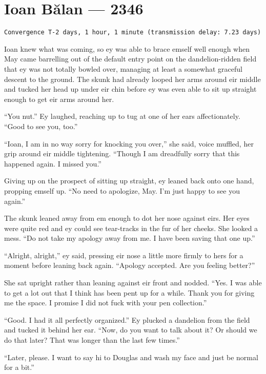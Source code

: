 \hypertarget{ioan-bux103lan-2346}{%
\chapter{Ioan Bălan — 2346}\label{ioan-bux103lan-2346}}

\begin{verbatim}
Convergence T-2 days, 1 hour, 1 minute (transmission delay: 7.23 days)
\end{verbatim}

Ioan knew what was coming, so ey was able to brace emself well enough when May came barrelling out of the default entry point on the dandelion-ridden field that ey was not totally bowled over, managing at least a somewhat graceful descent to the ground. The skunk had already looped her arms around eir middle and tucked her head up under eir chin before ey was even able to sit up straight enough to get eir arms around her.

``You nut.'' Ey laughed, reaching up to tug at one of her ears affectionately. ``Good to see you, too.''

``Ioan, I am in no way sorry for knocking you over,'' she said, voice muffled, her grip around eir middle tightening. ``Though I am dreadfully sorry that this happened again. I missed you.''

Giving up on the prospect of sitting up straight, ey leaned back onto one hand, propping emself up. ``No need to apologize, May. I'm just happy to see you again.''

The skunk leaned away from em enough to dot her nose against eirs. Her eyes were quite red and ey could see tear-tracks in the fur of her cheeks. She looked a mess. ``Do not take my apology away from me. I have been saving that one up.''

``Alright, alright,'' ey said, pressing eir nose a little more firmly to hers for a moment before leaning back again. ``Apology accepted. Are you feeling better?''

She sat upright rather than leaning against eir front and nodded. ``Yes. I was able to get a lot out that I think has been pent up for a while. Thank you for giving me the space. I promise I did not fuck with your pen collection.''

``Good. I had it all perfectly organized.'' Ey plucked a dandelion from the field and tucked it behind her ear. ``Now, do you want to talk about it? Or should we do that later? That was longer than the last few times.''

``Later, please. I want to say hi to Douglas and wash my face and just be normal for a bit.''

